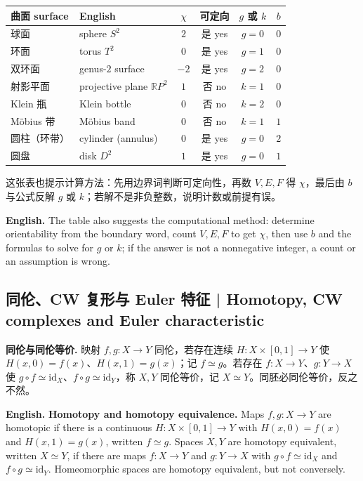 \documentclass[UTF8,11pt,a4paper]{ctexart}
\newcommand{\EN}[1]{\par\noindent\textbf{English.} #1\par}
\begin{document}
{\small
\begin{center}
\begin{tabular}{llcccc}
\toprule
曲面 surface & English & $\chi$ & 可定向 & $g$ 或 $k$ & $b$\\
\midrule
球面 & sphere $S^2$ & $2$ & 是 yes & $g=0$ & $0$\\
环面 & torus $T^2$ & $0$ & 是 yes & $g=1$ & $0$\\
双环面 & genus-$2$ surface & $-2$ & 是 yes & $g=2$ & $0$\\
射影平面 & projective plane $\mathbb RP^2$ & $1$ & 否 no & $k=1$ & $0$\\
Klein 瓶 & Klein bottle & $0$ & 否 no & $k=2$ & $0$\\
M\"obius 带 & M\"obius band & $0$ & 否 no & $k=1$ & $1$\\
圆柱（环带） & cylinder (annulus) & $0$ & 是 yes & $g=0$ & $2$\\
圆盘 & disk $D^2$ & $1$ & 是 yes & $g=0$ & $1$\\
\bottomrule
\end{tabular}
\end{center}
}
\noindent 这张表也提示计算方法：先用边界词判断可定向性，再数 $V,E,F$ 得 $\chi$，最后由 $b$ 与公式反解 $g$ 或 $k$；若解不是非负整数，说明计数或前提有误。
\EN{The table also suggests the computational method: determine orientability from the boundary word, count $V,E,F$ to get $\chi$, then use $b$ and the formulas to solve for $g$ or $k$; if the answer is not a nonnegative integer, a count or an assumption is wrong.}

\subsection{同伦、CW 复形与 Euler 特征 | Homotopy, CW complexes and Euler characteristic}
\noindent\textbf{同伦与同伦等价.} 映射 $f,g:X\to Y$ 同伦，若存在连续 $H:X\times[0,1]\to Y$ 使 $H(x,0)=f(x)$、$H(x,1)=g(x)$；记 $f\simeq g$。若存在 $f:X\to Y$、$g:Y\to X$ 使 $g\circ f\simeq\mathrm{id}_X$、$f\circ g\simeq\mathrm{id}_Y$，称 $X,Y$ 同伦等价，记 $X\simeq Y$。同胚必同伦等价，反之不然。
\EN{\textbf{Homotopy and homotopy equivalence.} Maps $f,g:X\to Y$ are homotopic if there is a continuous $H:X\times[0,1]\to Y$ with $H(x,0)=f(x)$ and $H(x,1)=g(x)$, written $f\simeq g$. Spaces $X,Y$ are homotopy equivalent, written $X\simeq Y$, if there are maps $f:X\to Y$ and $g:Y\to X$ with $g\circ f\simeq\mathrm{id}_X$ and $f\circ g\simeq\mathrm{id}_Y$. Homeomorphic spaces are homotopy equivalent, but not conversely.}
\end{document}
